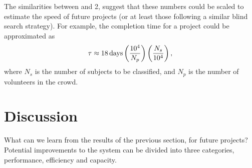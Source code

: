 \documentclass[useAMS,usenatbib,a4paper]{mn2e}
\begin{document}
The similarities between \StageOne and 2, suggest that these numbers could be
scaled to estimate the speed of future \SW projects (or at least those following
a similar blind search strategy). For example, the completion time for a \SW
project could be approximated as
\begin{equation}
    \tau \approx 18\,{\rm days} \left(\frac{10^4}{N_p}\right)
                               \left(\frac{N_s}{10^4}\right),
\end{equation}
where $N_s$ is the number of subjects to be classified, and $N_p$ is the number
of volunteers in the crowd.




\section{Discussion}
\label{sec:discuss}

What can we learn from the results of the previous section, for future
projects? Potential improvements to the \SW system can be divided into three
categories, performance, efficiency and capacity.

\end{document}
